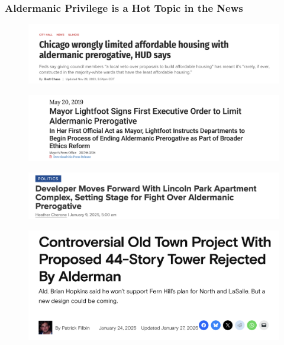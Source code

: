 \begin{frame}
	\frametitle{Aldermanic Privilege is a Hot Topic in the News}
    \begin{minipage}{0.5\textwidth}
        \begin{figure}
            \centering
            \includegraphics[width=\textwidth]{images/hud_report_headline.png}
		\end{figure}
		\begin{figure}
			\centering
			\includegraphics[width=\textwidth]{images/lightfoot_order.png}
		\end{figure}
		\begin{figure}
			\centering
			\includegraphics[width=\textwidth]{images/alderman_fight.png}
		\end{figure}
        \end{minipage}
        \hfill
        \begin{minipage}{0.48\textwidth}
        \begin{figure}
            \centering
            \includegraphics[width=\textwidth]{images/old_town_towers.png}

\end{figure}
\end{minipage}
\end{frame}
